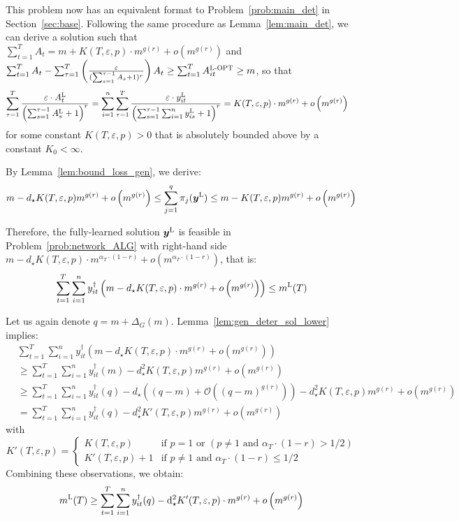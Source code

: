 \documentclass[nonblindrev]{informs3noheader}
\renewcommand{\d}{\mathrm{d}}
\def\calO{\mathcal{O}}
\def\by{\boldsymbol{y}}
\begin{document}
This problem now has an equivalent format to  Problem~\eqref{prob:main_det} in Section~\ref{sec:base}. Following the same procedure as Lemma~\ref{lem:main_det}, we can derive a solution such that $\sum_{t=1}^TA_t=m+K(T,\varepsilon,p)\cdot m^{g(r)}+o\left(m^{g(r)}\right)$ and $\sum_{t=1}^TA_t- \sum_{\tau=1}^T\left(\frac{\varepsilon}{(\sum_{s=1}^{\tau-1}A_s+1)^r}\right)A_t\geq\sum_{t=1}^T A^{\textsc{L-OPT}}_{it}\geq m$, so that
\begin{align*}
	\sum_{\tau=1}^T\frac{\varepsilon\cdot A^{\textsc{L}}_t}{\left(\sum_{s=1}^{\tau-1}A^{\textsc{L}}_s+1\right)^r}
	&= \sum_{i=1}^n\sum_{\tau=1}^T\frac{\varepsilon\cdot y^{\textsc{L}}_{it}}{\left(\sum_{s=1}^{\tau-1}\sum_{i=1}^n y^{\textsc{L}}_{is}+1\right)^r}
	=K(T,\varepsilon,p)\cdot m^{g(r)} + o\left(m^{g(r)}\right)
\end{align*}
for some constant $K(T,\varepsilon,p)>0$ that is absolutely bounded above by a constant $K_0<\infty $.

By Lemma~\ref{lem:bound_loss_gen}, we derive:
$$m -d_\star K(T,\varepsilon,p)m^{g(r)}+o\left(m^{g(r)}\right)\leq \sum_{j=1}^q\pi_{j}(\by^{\textsc{L}})\leq m -K(T,\varepsilon,p)m^{g(r)}+o\left(m^{g(r)}\right)$$

Therefore, the fully-learned solution $\by^{\textsc{L}}$ is feasible in Problem~\eqref{prob:network_ALG} with right-hand side $m - d_\star K(T,\varepsilon,p)\cdot m^{\alpha_T \cdot (1-r)}+o\left(m^{\alpha_T\cdot(1-r)}\right)$, that is:
$$\sum_{t=1}^T \sum_{i=1}^n y_{it}^\dagger\left(m - d_\star K(T,\varepsilon,p)\cdot m^{g(r)}+o\left(m^{g(r)}\right)\right)\leq m^{\textsc{L}}(T)$$

Let us again denote $q=m+\Delta_G(m)$. Lemma~\ref{lem:gen_deter_sol_lower} implies:
\begin{align*}
   &\sum_{t=1}^T \sum_{i=1}^n y_{it}^\dagger\left(m - d_\star K(T,\varepsilon,p)\cdot m^{g(r)}+o\left(m^{g(r)}\right)\right)\\
   &\geq \sum_{t=1}^T \sum_{i=1}^n y_{it}^\dagger(m)-d_\star^2 K(T,\varepsilon,p) m^{g(r)} + o\left(m^{g(r)}\right)\\
   &\geq \sum_{t=1}^T \sum_{i=1}^n y_{it}^\dagger(q)-d_\star \left((q-m)+\calO\left((q-m)^{g(r)}\right)\right)-d_\star^2  K(T,\varepsilon,p) m^{g(r)} + o\left(m^{g(r)}\right)\\
   &=	 \sum_{t=1}^T \sum_{i=1}^n y_{it}^\dagger(q)-d_\star^2 K'(T,\varepsilon,p) m^{g(r)} + o\left(m^{g(r)}\right) 
\end{align*}
with
$$K'(T,\varepsilon,p)=\begin{cases}
	K(T,\varepsilon,p)& \text{if }p=1 \text{ or } (p \neq 1 \text{ and } \alpha_T\cdot(1-r)>1/2)\\
	K'(T,\varepsilon,p)+1 & \text{if }p \neq 1\text{ and } \alpha_T\cdot(1-r)\leq 1/2        
\end{cases} $$
Combining these observations, we obtain:
$$m^{\textsc{L}}(T)\geq\sum_{t=1}^T \sum_{i=1}^n y_{it}^\dagger(q)-\d_\star^2 K'(T,\varepsilon,p)\cdot m^{g(r)}+ o\left(m^{g(r)}\right)$$
\end{document}
